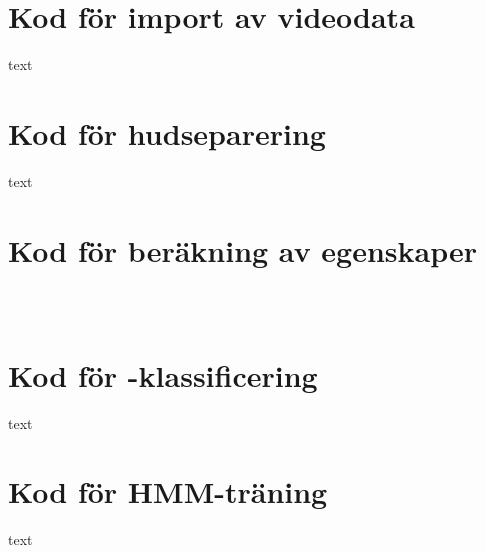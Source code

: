 \documentclass[../rapport_MVEX01-11-05]{subfiles}
\begin{document}

\section{Kod för import av videodata}

text

\section{Kod för hudseparering}

text

\section{Kod för beräkning av egenskaper}\label{sec:matlab:features}

\inputminted[linenos,bgcolor=codebg,texcl,fontsize=\small]{matlab}{kod/features.m}
\newpage
\inputminted[linenos,bgcolor=codebg,texcl,fontsize=\small,lastline=50]{matlab}{kod/moments.m}
\newpage
\inputminted[linenos,bgcolor=codebg,texcl,fontsize=\small,firstline=51,firstnumber=51]{matlab}{kod/moments.m}


\section{Kod för \knn-klassificering}

text

\section{Kod för HMM-träning}

text

\end{document}
